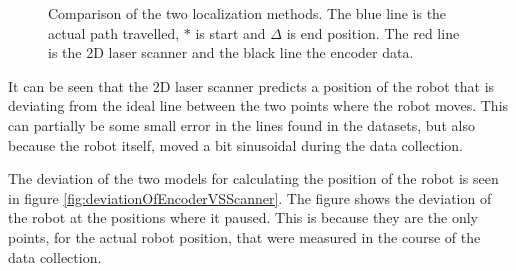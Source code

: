\begin{figure}[H]
\centering
{}
\caption[Comparison of the two localization methods.]{Comparison of the two localization methods. The blue line is the actual path travelled, $*$ is start and $\Delta$ is end position. The red line is the 2D laser scanner and the black line the encoder data.}
\label{fig:comparisonOfEncoderVSScanner}
\end{figure}

It can be seen that the 2D laser scanner predicts a position of the robot that is deviating from the ideal line between the two points where the robot moves.
This can partially be some small error in the lines found in the datasets, but also because the robot itself, moved a bit sinusoidal during the data collection.

The deviation of the two models for calculating the position of the robot is seen in figure \ref{fig:deviationOfEncoderVSScanner}.
The figure shows the deviation of the robot at the positions where it paused. 
This is because they are the only points, for the actual robot position, that were measured in the course of the data collection.

